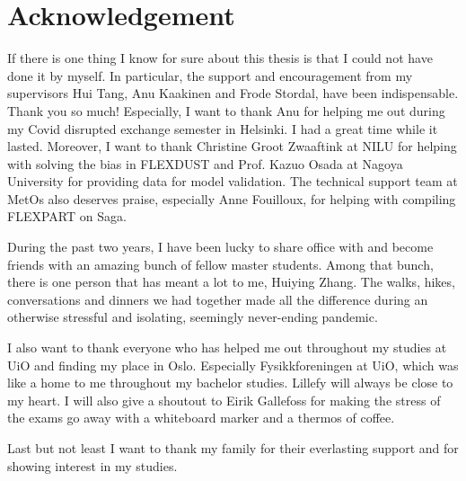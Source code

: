 \chapter{Acknowledgement}
If there is one thing I know for sure about this thesis is that I could not have done it by myself. 
In particular, the support and encouragement from my supervisors Hui Tang, Anu Kaakinen and Frode Stordal, have been indispensable. Thank you so much!
Especially, I want to thank Anu for helping me out during my Covid disrupted exchange semester in Helsinki. I had a great time while it lasted. 
Moreover, I want to thank Christine Groot Zwaaftink at NILU for helping with solving the bias in FLEXDUST and Prof. Kazuo Osada at Nagoya University for providing data for model validation. The technical support team at MetOs also deserves praise, especially Anne Fouilloux, for helping with compiling FLEXPART on Saga. 

During the past two years, I have been lucky to share office with and become friends with an amazing bunch of fellow master students.
Among that bunch, there is one person that has meant a lot to me, Huiying Zhang. 
The walks, hikes, conversations and dinners we had together made all the difference during an otherwise stressful and isolating, seemingly never-ending pandemic. 


I also want to thank everyone who has helped me out throughout my studies at UiO and finding my place in Oslo. Especially Fysikkforeningen at UiO, which was like a home to me throughout my bachelor studies. Lillefy will always be close to my heart. I will also give a shoutout to Eirik Gallefoss for making the stress of the exams go away with a whiteboard marker and a thermos of coffee. 

Last but not least I want to thank my family for their everlasting support and for showing interest in my studies. 